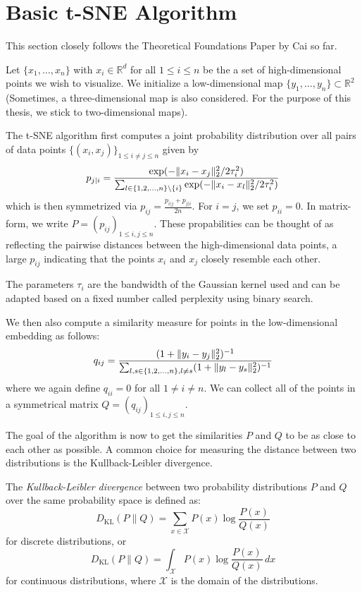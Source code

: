 \section{Basic t-SNE Algorithm}
This section closely follows the Theoretical Foundations Paper by Cai \cite{JMLR:v23:21-0524} so far. 

Let $\{x_1, \dots , x_n \}$ with $x_i \in \mathbb{R}^d$ for all $1 \leq i \leq n$ be the a set of high-dimensional points we wish to visualize. We initialize a low-dimensional map $\{y_1, \dots , y_n\} \subset \mathbb{R}^2$ (Sometimes, a three-dimensional map is also considered. For the purpose of this thesis, we stick to two-dimensional maps). 

The t-SNE algorithm first computes a joint probability distribution over all pairs of data points $\{(x_i, x_j)\}_{1 \leq i \neq j \leq n}$ given by 
\begin{equation}
    p_{j|i} =  \frac{\exp(-\lVert x_i - x_j\rVert_2^2 / 2\tau_i^2)}{\sum_{l \in \{1,2, \dots, n\} \backslash \{i\}} \exp({-\lVert x_i - x_l\rVert_2^2 / 2 \tau_i^2})}
\end{equation}
which is then symmetrized via $p_{ij} = \frac{p_{i|j} + p_{j|i}}{2n}$. For $i=j$, we set $p_{ii}=0$. In matrix-form, we write $P = (p_{ij})_{1 \leq i, j \leq n}$. These propabilities can be thought of as reflecting the pairwise distances between the high-dimensional data points, a large $p_{ij}$ indicating that the points $x_i$ and $x_j$ closely resemble each other. 

The parameters $\tau_i$ are the bandwidth of the Gaussian kernel used and can be adapted based on a fixed number called perplexity using binary search. 

We then also compute a similarity measure for points in the low-dimensional embedding as follows: 
\begin{equation}
    q_{ij} = \frac{(1+ \lVert y_i - y_j\rVert_2^2)^{-1}}{\sum_{l, s \in \{1,2, \dots, n \}, l \neq s } (1+\lVert y_l - y_s\rVert_2^2)^{-1}}
\end{equation}
where we again define $q_{ii} = 0$ for all $1 \neq i \neq n$. We can collect all of the points in a symmetrical matrix $Q = (q_{ij})_{1 \leq i, j \leq n}$. 

The goal of the algorithm is now to get the similarities $P$ and $Q$ to be as close to each other as possible. A common choice for measuring the distance between two distributions is the Kullback-Leibler divergence. 

\begin{defi}
    The \emph{Kullback-Leibler divergence} between two probability distributions $P$ and $Q$ over the same probability space is defined as:
    \[
    D_{\text{KL}}(P \parallel Q) = \sum_{x \in \mathcal{X}} P(x) \log\frac{P(x)}{Q(x)}
    \]
    for discrete distributions, or
    \[
    D_{\text{KL}}(P \parallel Q) = \int_{\mathcal{X}} P(x) \log\frac{P(x)}{Q(x)} \, dx
    \]
    for continuous distributions, where \(\mathcal{X}\) is the domain of the distributions.
\end{defi}

